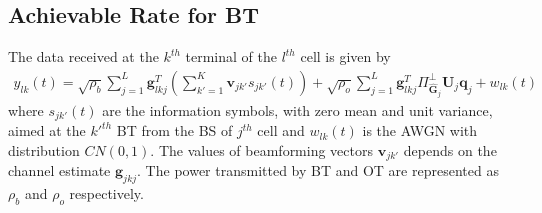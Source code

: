 \documentclass[10pt, a4paper, twoside,fleqn]{article}
\begin{document}
\subsection{Achievable Rate for BT}

The data received at the $k^{th}$ terminal of the $l^{th}$ cell is given by
\begin{eqnarray}\label{eq:ot}
 	y_{lk}(t) = \sqrt{\rho_b}\sum_{j=1}^{L} \pmb{g}_{lkj}^{T} \left(\sum_{k'=1}^{K}\pmb{v}_{jk'}s_{jk'}(t)\right)
 		      + \sqrt{\rho_o}\sum_{j=1}^{L}\pmb{g}^T_{lkj} \Pi^{\perp}_{{\pmb{\widehat{G}}_j}} \pmb{U}_j\pmb{q}_{j}+ w_{lk}(t)
\end{eqnarray} 
where $s_{jk'}(t)$ are the information symbols, with zero mean and unit variance, aimed at the $k'^{th}$ BT from the BS of $j^{th}$ cell and $w_{lk}(t)$ is the AWGN with distribution $CN(0,1)$.
The values of beamforming vectors $\pmb{v}_{jk'}$ depends on the channel estimate $\pmb{g}_{jkj}$. The power transmitted by BT and OT are represented as $\rho_b$ and $\rho_o$ respectively.
\end{document}

